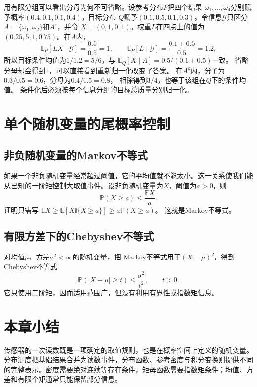 用有限分组可以看出分母为何不可省略。设参考分布\(P\)把四个结果
\(\omega_1,\ldots,\omega_4\)分别赋予概率\((0.4,0.1,0.1,0.4)\)，目标分布
\(Q\)赋予\((0.1,0.5,0.1,0.3)\)。令信息\(\mathcal{G}\)只区分
\(A=\{\omega_1,\omega_2\}\)和\(A^{\mathsf c}\)，并令
\(X=(0,1,0,1)\)。权重\(L\)在四点上的值为\((0.25,5,1,0.75)\)。在\(A\)内，
\[
  \mathbb{E}_P[LX\mid\mathcal{G}]
  =\frac{0.5}{0.5}=1,\qquad
  \mathbb{E}_P[L\mid\mathcal{G}]
  =\frac{0.1+0.5}{0.5}=1.2,
\]
所以目标条件均值为\(1/1.2=5/6\)，与
\(\mathbb{E}_Q[X\mid A]=0.5/(0.1+0.5)\)一致。
省略分母却会得到\(1\)，可以直接看到重新归一化改变了答案。
在\(A^{\mathsf c}\)内，分子为\(0.3/0.5=0.6\)，分母为\(0.4/0.5=0.8\)，
相除得到\(3/4\)，也等于该组在\(Q\)下的条件均值。
条件化后必须按每个信息分组的目标总质量分别归一化。

\section{单个随机变量的尾概率控制}
\label{sec:probability-elementary-tail-bounds}
\subsection{非负随机变量的Markov不等式}
如果一个非负随机变量经常超过阈值，它的平均值就不能太小。这一关系使我们能从已知的一阶矩控制大取值事件。设非负随机变量为\(X\)，阈值为\(a>0\)，则
\begin{equation}
  \mathbb{P}(X\geq a)
  \leq
  \frac{\mathbb{E}X}{a}.
  \label{eq:probability-markov-inequality}
\end{equation}
证明只需写
\(\mathbb{E}X\geq
\mathbb{E}[X\mathbb{I}\{X\geq a\}]
\geq a\mathbb{P}(X\geq a)\)。
这就是Markov不等式。

\subsection{有限方差下的Chebyshev不等式}
对均值\(\mu\)、方差\(\sigma^2<\infty\)的随机变量，把
Markov不等式用于\((X-\mu)^2\)，得到Chebyshev不等式
\begin{equation}
  \mathbb{P}(|X-\mu|\geq t)
  \leq\frac{\sigma^2}{t^2},
  \qquad t>0.
  \label{eq:probability-chebyshev-inequality}
\end{equation}
它只使用二阶矩，因而适用范围广，但没有利用有界性或指数矩信息。

\section{本章小结}
\label{sec:probability-summary}
传感器的一次读数既是一项确定的取值规则，也是在概率空间上定义的随机变量。分布测度把基础结果合并为读数事件，分布函数、参考密度与积分变换则提供不同的完整表示。密度需要绝对连续等存在条件，矩母函数需要指数矩条件；均值、方差和有限个矩通常只能保留部分信息。

